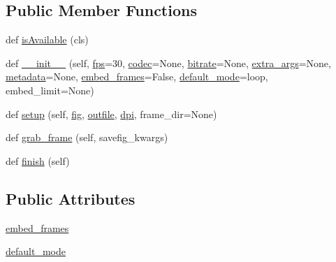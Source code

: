 \subsection*{Public Member Functions}
\begin{DoxyCompactItemize}
\item 
def \hyperlink{classmatplotlib_1_1animation_1_1HTMLWriter_a9e78ee19d94fed5cd85cf49b9c39a4bb}{is\+Available} (cls)
\item 
def \hyperlink{classmatplotlib_1_1animation_1_1HTMLWriter_a67a530fcb4954309d15c532193337b26}{\+\_\+\+\_\+init\+\_\+\+\_\+} (self, \hyperlink{classmatplotlib_1_1animation_1_1AbstractMovieWriter_aaf7656da4e1f760b64f453cffbe15a82}{fps}=30, \hyperlink{classmatplotlib_1_1animation_1_1MovieWriter_a58c85e59e54995fbe71588aa6a2a4b08}{codec}=None, \hyperlink{classmatplotlib_1_1animation_1_1AbstractMovieWriter_a8437f6e4c409bdd6392b1d354e9bc4c5}{bitrate}=None, \hyperlink{classmatplotlib_1_1animation_1_1MovieWriter_a04961dd29276d116758c5ba8229b32f2}{extra\+\_\+args}=None, \hyperlink{classmatplotlib_1_1animation_1_1AbstractMovieWriter_a5a23958781c90f0aae7ac29ef6a7401f}{metadata}=None, \hyperlink{classmatplotlib_1_1animation_1_1HTMLWriter_aa91c0f47859808e747822d5b2d25edd1}{embed\+\_\+frames}=False, \hyperlink{classmatplotlib_1_1animation_1_1HTMLWriter_a73f8bdd99774c8044313261a80da7a10}{default\+\_\+mode}=\textquotesingle{}loop\textquotesingle{}, embed\+\_\+limit=None)
\item 
def \hyperlink{classmatplotlib_1_1animation_1_1HTMLWriter_ada282768a3661682d19fcd40bd808c38}{setup} (self, \hyperlink{classmatplotlib_1_1animation_1_1FileMovieWriter_ac61243658714a398ea13b2821a756647}{fig}, \hyperlink{classmatplotlib_1_1animation_1_1FileMovieWriter_ae3ef0c1fca69da36e21ce4e65be58439}{outfile}, \hyperlink{classmatplotlib_1_1animation_1_1FileMovieWriter_acb15d67886c11ad2174b258d7a340a45}{dpi}, frame\+\_\+dir=None)
\item 
def \hyperlink{classmatplotlib_1_1animation_1_1HTMLWriter_a0a66f155afa0310be455945aa1a029c8}{grab\+\_\+frame} (self, savefig\+\_\+kwargs)
\item 
def \hyperlink{classmatplotlib_1_1animation_1_1HTMLWriter_a4c96ec1fad0122882b2d20accfff42d5}{finish} (self)
\end{DoxyCompactItemize}
\subsection*{Public Attributes}
\begin{DoxyCompactItemize}
\item 
\hyperlink{classmatplotlib_1_1animation_1_1HTMLWriter_aa91c0f47859808e747822d5b2d25edd1}{embed\+\_\+frames}
\item 
\hyperlink{classmatplotlib_1_1animation_1_1HTMLWriter_a73f8bdd99774c8044313261a80da7a10}{default\+\_\+mode}
\end{DoxyCompactItemize}
